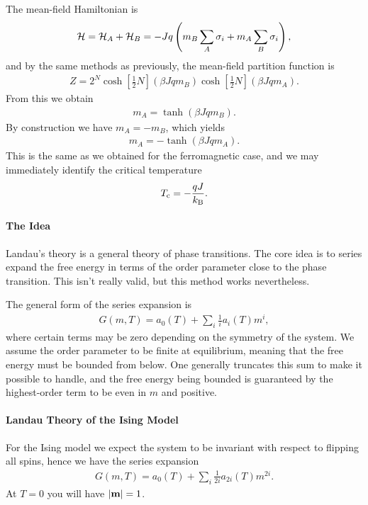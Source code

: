 The mean-field Hamiltonian is
\begin{align*}
	\mathcal{H} = \mathcal{H}_{A} + \mathcal{H}_{B} = -Jq\left(m_{B}\sum\limits_{A}\sigma_{i} + m_{A}\sum\limits_{B}\sigma_{i}\right),
\end{align*}
and by the same methods as previously, the mean-field partition function is
\begin{align*}
	Z = 2^{N}\cosh[\frac{1}{2}N](\beta Jqm_{B})\cosh[\frac{1}{2}N](\beta Jqm_{A}).
\end{align*}
From this we obtain
\begin{align*}
	m_{A} = \tanh(\beta Jqm_{B}).
\end{align*}
By construction we have $m_{A} = -m_{B}$, which yields
\begin{align*}
	m_{A} = -\tanh(\beta Jqm_{A}).
\end{align*}
This is the same as we obtained for the ferromagnetic case, and we may immediately identify the critical temperature
\begin{align*}
	T_{\text{c}} = -\frac{qJ}{k_{\text{B}}}.
\end{align*}

\paragraph{The Idea}
Landau's theory is a general theory of phase transitions. The core idea is to series expand the free energy in terms of the order parameter close to the phase transition. This isn't really valid, but this method works nevertheless.

The general form of the series expansion is
\begin{align*}
	G(m, T) = a_{0}(T) + \sum\limits_{i}\frac{1}{i}a_{i}(T)m^{i},
\end{align*}
where certain terms may be zero depending on the symmetry of the system. We assume the order parameter to be finite at equilibrium, meaning that the free energy must be bounded from below. One generally truncates this sum to make it possible to handle, and the free energy being bounded is guaranteed by the highest-order term to be even in $m$ and positive.

\paragraph{Landau Theory of the Ising Model}
For the Ising model we expect the system to be invariant with respect to flipping all spins, hence we have the series expansion
\begin{align*}
	G(m, T) = a_{0}(T) + \sum\limits_{i}\frac{1}{2i}a_{2i}(T)m^{2i}.
\end{align*}
At $T = 0$ you will have $\abs{\vb{m}} = 1$.

